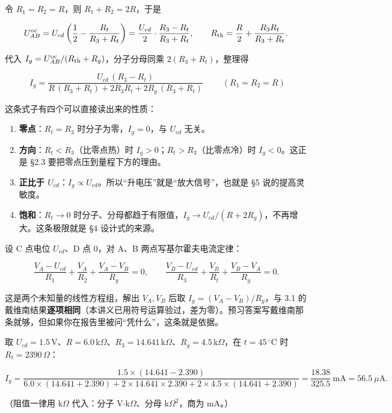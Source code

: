 \documentclass[11pt]{ctexart}
\newcommand{\degC}{\ensuremath{\,^\circ\mathrm{C}}}
\begin{document}

令 $R_1=R_2=R$，则 $R_1+R_2=2R$，于是

\[
U_{AB}^{\rm oc}=U_{cd}\left(\frac12-\frac{R_t}{R_3+R_t}\right)
=\frac{U_{cd}}{2}\cdot\frac{R_3-R_t}{R_3+R_t},
\qquad
R_{\rm th}=\frac{R}{2}+\frac{R_3R_t}{R_3+R_t}.
\]

代入 $I_g=U_{AB}^{\rm oc}/(R_{\rm th}+R_g)$，分子分母同乘 $2(R_3+R_t)$，整理得

\[
\boxed{\;
I_g=\frac{U_{cd}\,(R_3-R_t)}{R\,(R_3+R_t)+2R_3R_t+2R_g\,(R_3+R_t)}\;}
\qquad (R_1=R_2=R)
\]

这条式子有四个可以直接读出来的性质：

\begin{enumerate}
\item \textbf{零点}：$R_t=R_3$ 时分子为零，$I_g=0$，与 $U_{cd}$ 无关。
\item \textbf{方向}：$R_t<R_3$（比零点热）时 $I_g>0$；$R_t>R_3$（比零点冷）时 $I_g<0$。这正是 §2.3 要把零点压到量程下方的理由。
\item \textbf{正比于 $U_{cd}$}：$I_g\propto U_{cd}$。所以“升电压”就是“放大信号”，也就是 §5 说的提高灵敏度。
\item \textbf{饱和}：$R_t\to0$ 时分子、分母都趋于有限值，$I_g\to U_{cd}/(R+2R_g)$，不再增大。这条极限就是 §4 设计式的来源。
\end{enumerate}


设 C 点电位 $U_{cd}$、D 点 0，对 A、B 两点写基尔霍夫电流定律：

\[
\frac{V_A-U_{cd}}{R_1}+\frac{V_A}{R_2}+\frac{V_A-V_B}{R_g}=0,
\qquad
\frac{V_B-U_{cd}}{R_3}+\frac{V_B}{R_t}+\frac{V_B-V_A}{R_g}=0 .
\]

这是两个未知量的线性方程组，解出 $V_A,V_B$ 后取 $I_g=(V_A-V_B)/R_g$，与 3.1 的戴维南结果\textbf{逐项相同}（本讲义已用符号运算验过，差为零）。预习答案写戴维南那条就够，但如果你在报告里被问“凭什么”，这条就是依据。

\subhdr{3.4 数字核对：示例设计下 45\degC 该读多少}

取 $U_{cd}=1.5$\,V、$R=6.0$\,k$\Omega$、$R_3=14.641$\,k$\Omega$、$R_g=4.5$\,k$\Omega$，在 $t=45\degC$ 时 $R_t=2390\,\Omega$：

{\small
\[
I_g=\frac{1.5\times(14.641-2.390)}
{6.0\times(14.641+2.390)+2\times14.641\times2.390+2\times4.5\times(14.641+2.390)}
=\frac{18.38}{325.5}\ \mathrm{mA}=56.5\ \mu\mathrm{A}.
\]}

（阻值一律用 k$\Omega$ 代入：分子 V$\cdot$k$\Omega$、分母 k$\Omega^2$，商为 mA。）
\end{document}
